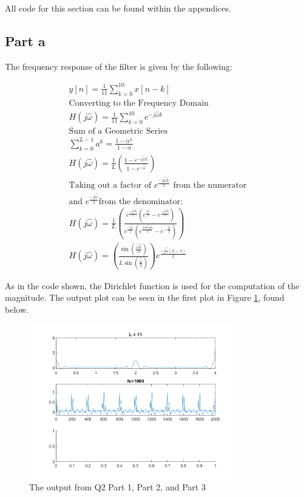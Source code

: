 All code for this section can be found within the appendices.

\subsection{Part a}

The frequency response of the filter is given by the following:

\begin{gather*}
	y[n]=\frac{1}{11}\sum_{k=0}^{10} x[n-k] \\
	\text{Converting to the Frequency Domain} \\
	H(j\hat{\omega})=\frac{1}{11}\sum_{k=0}^{10} e^{-j\hat{\omega}k} \\
	\text{Sum of a Geometric Series} \\
	\sum_{k=0}^{L-1} a^k=\frac{1-\alpha^L}{1-\alpha} \\
	H(j\hat{\omega})=\frac{1}{L}(\frac{1-e^{-j\hat{\omega}L}}{1-e^{-\hat{\omega}}})\\
	\text{Taking out a factor of } e^{\frac{-j\hat{\omega}L}{2}} \text{ from the
	numerator} \\
	\text{and } e^{\frac{-j\hat{\omega}}{2}} \text{from the denominator:} \\
	H(j\hat{\omega})=\frac{1}{L}(\frac{e^{\frac{-j\hat{\omega}L}{2}}(e^{\frac{j\hat{\omega}}{2}}-e^{\frac{-j\hat{\omega}L}{2}})}{e^{\frac{-j\hat{\omega}}{2}}(e^{\frac{j\hat{omega}}{2}}-e^{-\frac{j\hat{\omega}}{2}})}) \\
	H(j\hat{\omega})=(\frac{\sin(\frac{\hat{\omega
	L}}{2})}{L\sin(\frac{\hat{\omega}}{2})})e^{\frac{-j\hat{\omega}(L-1)}{2}}
\end{gather*}

As in the code shown, the Dirichlet function is used for the computation of the
magnitude. The output plot can be seen in the first plot in Figure
\ref{fig:Q2Img}, found below.

\begin{figure}[H]
	\centering
	\includegraphics[width=0.8\textwidth]{images/Q2.png}
	\caption{The output from Q2 Part 1, Part 2, and Part 3}
	\label{fig:Q2Img}
\end{figure}
